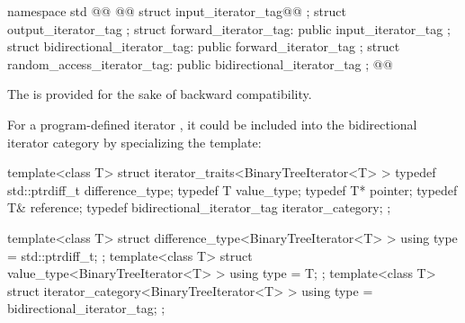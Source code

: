 \begin{codeblock}
namespace std { @@
  @@
  struct input_iterator_tag@@ { };
  struct output_iterator_tag { };
  struct forward_iterator_tag: public input_iterator_tag { };
  struct bidirectional_iterator_tag: public forward_iterator_tag { };
  struct random_access_iterator_tag: public bidirectional_iterator_tag { };
}@\added{\}\}}\newtxt{\}}@
\end{codeblock}

\begin{addedblock}
\pnum
\enternote
The  is provided for the sake of backward compatibility.
\exitnote
\end{addedblock}

\pnum
{}%
%
%
%
%
%
%
\enterexample
For a program-defined iterator
,
it could be included
into the bidirectional iterator category by specializing the
\added{, }
 template:

\begin{removedblock}
\begin{codeblock}
template<class T> struct iterator_traits<BinaryTreeIterator<T> > {
  typedef std::ptrdiff_t difference_type;
  typedef T value_type;
  typedef T* pointer;
  typedef T& reference;
  typedef bidirectional_iterator_tag iterator_category;
};
\end{codeblock}
\end{removedblock}
\begin{addedblock}
\begin{codeblock}
template<class T> struct difference_type<BinaryTreeIterator<T> > {
  using type = std::ptrdiff_t;
};
template<class T> struct value_type<BinaryTreeIterator<T> > {
  using type = T;
};
template<class T> struct iterator_category<BinaryTreeIterator<T> > {
  using type = bidirectional_iterator_tag;
};
\end{codeblock}
\end{addedblock}

